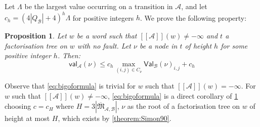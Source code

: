 \documentclass[10pt,a4paper]{amsart}
\newtheorem{prop}[prop]{Proposition}
\theoremstyle{definition}
\numberwithin{equation}{section}
\theoremstyle{remark}
\newcommand{\ideal}{\mathfrak{M}}
\newcommand{\autA}{\mathcal{A}}
\newcommand{\autB}{\mathcal{B}}
\newcommand{\brfunc}[1]{[\![#1]\!]}
\newcommand{\funcA}{\brfunc{\autA}}
\newcommand{\aval}{\mathsf{val}_\autA}
\newcommand{\bval}{\mathsf{Val}_\autB}
\theoremstyle{remark}
\begin{document}
Let $\Lambda$ be the largest value occurring on a transition in $\autA$, and let $c_h = (4|Q_\mathcal{B}|+4)^{h}\Lambda$ for positive integers $h$. We prove the following property:

\begin{prop}
\label{prop:nofault}
Let $w$ be a word such that $\funcA(w) \neq -\infty$ and $t$ a factorisation tree on $w$ with no fault. Let $\nu$ be a node in $t$ of height $h$ for some positive integer $h$. Then:
\[ \aval(\nu) \leq c_h \max_{(i,j) \in C_{\nu}} \bval(\nu)_{i,j} + c_h\]
\end{prop}

Observe that \cref{eq:bigoformula} is trivial for $w$ such that $\funcA(w) = -\infty$. For $w$ such that $\funcA(w) \neq -\infty$,  \cref{eq:bigoformula} is a direct corollary of \cref{prop:nofault} choosing $c=c_H$ where $H = 3|\overline{\ideal}_{\autA,\autB}|$, $\nu$ as the root of a factorisation tree on $w$ of height at most $H$, which exists by \cref{theorem:Simon90}.
\end{document}
